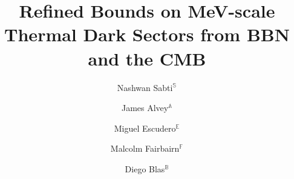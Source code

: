 \documentclass[notitlepage,letterpaper,natbib,aps,prd,onecolumn,amsmath,amsfonts,nofootinbib,preprintnumbers,superscriptaddress,secnumarabic,groupedaddress]{revtex4-1}
\begin{document}
\title{Refined Bounds on MeV-scale Thermal Dark Sectors from BBN and the CMB}

\author{Nashwan Sabti$^\mathds{S}$}

\author{James Alvey$^\mathds{A}$}

\author{Miguel Escudero$^\mathds{E}$}

\author{Malcolm Fairbairn$^\mathds{F}$}

\author{Diego Blas$^\mathds{B}$}
\end{document}
